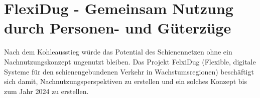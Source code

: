 \section{FlexiDug - Gemeinsam Nutzung durch Personen- und Güterzüge}

Nach dem Kohleausstieg würde das Potential des Schienennetzen ohne ein Nachnutzungskonzept ungenutzt bleiben. Das Projekt FelxiDug (Flexible, digitale Systeme für den schienengebundenen Verkehr in Wachstumsregionen) beschäftigt sich damit, Nachnutzungsperspektiven zu erstellen und ein solches Konzept bis zum Jahr 2024 zu erstellen.
